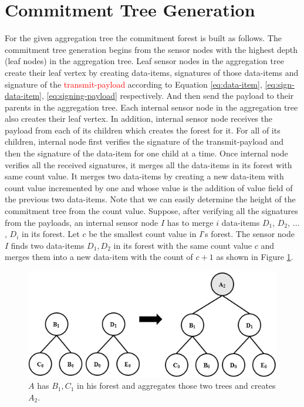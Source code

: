 \section{Commitment Tree Generation}
	For the given aggregation tree the commitment forest is built as follows.
	The commitment tree generation begins from the sensor nodes with the highest depth (leaf nodes) in the aggregation tree.
	Leaf sensor nodes in the aggregation tree create their leaf vertex by creating data-items, signatures of those data-items and signature of the \textcolor{red}{transmit-payload} according to Equation \ref{eq:data-item}, \ref{eq:sign-data-item}, \ref{eq:signing-payload} respectively.
	And then send the payload to their parents in the aggregation tree.	
	Each internal sensor node in the aggregation tree also creates their leaf vertex.
	In addition, internal sensor node receives the payload from each of its children which creates the forest for it.
	For all of its children, internal node first verifies the signature of the transmit-payload and then the signature of the data-item for one child at a time.
	Once internal node verifies all the received signatures, it merges all the data-items in its forest with same count value.
	It merges two data-items by creating a new data-item with count value incremented by one and whose value is the addition of value field of the previous two data-items. 
	Note that we can easily determine the height of the commitment tree from the count value.
	Suppose, after verifying all the signatures from the payloads, an internal sensor node $I$ has to merge $i$ data-items $D_{1}$, $D_{2}$, $\dotsc$, $D_{i}$ in its forest.
	Let $c$ be the smallest count value in $I$'s forest.
	The sensor node $I$ finds two data-items $D_{1},D_{2}$ in its forest with the same count value $c$ and merges them into a new data-item with the count of $c+1$ as shown in Figure \ref{fig:increase-height}.
	\begin{figure}[h!]
		\includegraphics{images/increase-height.png}
		\caption{$A$ has $B_{1}, C_{1}$ in his forest and aggregates those two trees and creates $A_{2}$.}
		\label{fig:increase-height}
	\end{figure}
